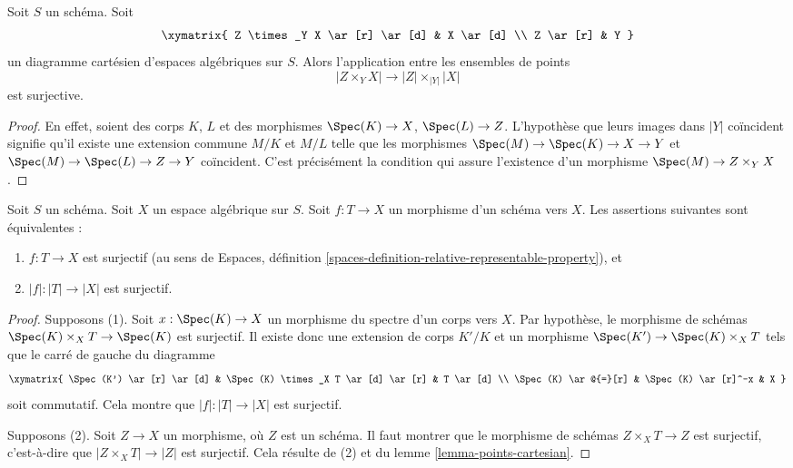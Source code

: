 \begin{lemma}
\label{lemma-points-cartesian}
Soit $S$ un schéma. Soit
$$
\xymatrix{
Z \times_Y X \ar[r] \ar[d] & X \ar[d] \\
Z \ar[r] & Y
}
$$
un diagramme cartésien d'espaces algébriques sur $S$. Alors l'application entre les ensembles
de points
$$
|Z \times_Y X|
\longrightarrow
|Z| \times_{|Y|} |X|
$$
est surjective.
\end{lemma}

\begin{proof}
En effet, soient des corps $K$, $L$ et des morphismes
$\Spec(K) \to X$, $\Spec(L) \to Z$. L'hypothèse
que leurs images dans $|Y|$ coïncident signifie qu'il
existe une extension commune $M/K$ et $M/L$
telle que les morphismes
$\Spec(M) \to \Spec(K) \to X \to Y$ et
$\Spec(M) \to \Spec(L) \to Z \to Y$ coïncident.
C'est précisément la condition qui assure l'existence d'un
morphisme $\Spec(M) \to Z \times_Y X$.
\end{proof}

\begin{lemma}
\label{lemma-characterize-surjective}
Soit $S$ un schéma.
Soit $X$ un espace algébrique sur $S$.
Soit $f : T \to X$ un morphisme d'un schéma vers $X$.
Les assertions suivantes sont équivalentes :
\begin{enumerate}
\item $f : T \to X$ est surjectif (au sens de
Espaces, définition \ref{spaces-definition-relative-representable-property}),
et
\item $|f| : |T| \to |X|$ est surjectif.
\end{enumerate}
\end{lemma}

\begin{proof}
Supposons (1). Soit $x : \Spec(K) \to X$ un morphisme
du spectre d'un corps vers $X$. Par hypothèse, le morphisme de
schémas $\Spec(K) \times_X T \to \Spec(K)$ est surjectif.
Il existe donc une extension de corps $K'/K$ et un morphisme
$\Spec(K') \to \Spec(K) \times_X T$ tels que le carré
de gauche du diagramme
$$
\xymatrix{
\Spec(K') \ar[r] \ar[d] &
\Spec(K) \times_X T \ar[d] \ar[r] &
T \ar[d] \\
\Spec(K) \ar@{=}[r] &
\Spec(K) \ar[r]^-x & X
}
$$
soit commutatif. Cela montre que $|f| : |T| \to |X|$ est surjectif.

\medskip\noindent
Supposons (2). Soit $Z \to X$ un morphisme, où $Z$ est
un schéma. Il faut montrer que le morphisme de schémas $Z \times_X T \to Z$
est surjectif, c'est-à-dire que $|Z \times_X T| \to |Z|$ est surjectif.
Cela résulte de (2) et du
lemme \ref{lemma-points-cartesian}.
\end{proof}

